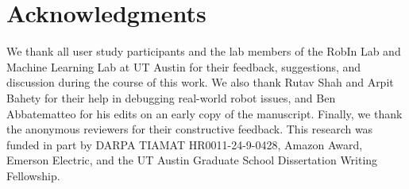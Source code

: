
\section*{Acknowledgments}
We thank all user study participants and the lab members of the RobIn Lab and Machine Learning Lab at UT Austin for their feedback, suggestions, and discussion during the course of this work. We also thank Rutav Shah and Arpit Bahety for their help in debugging real-world robot issues, and Ben Abbatematteo for his edits on an early copy of the manuscript. Finally, we thank the anonymous reviewers for their constructive feedback. This research was funded in part by DARPA TIAMAT HR0011-24-9-0428, Amazon Award, Emerson Electric, and the UT Austin Graduate School Dissertation Writing Fellowship.